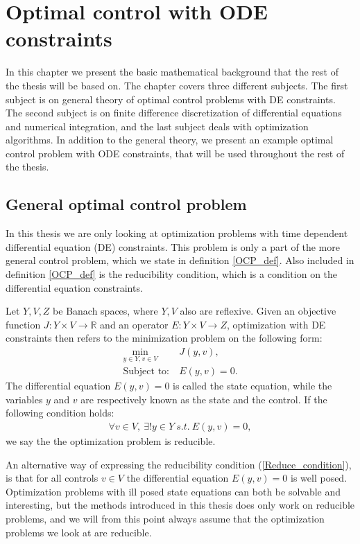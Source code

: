 \chapter{Optimal control with ODE constraints} \label{math_chap}
In this chapter we present the basic mathematical background that the rest of the thesis will be based on. The chapter covers three different subjects. The first subject is on general theory of optimal control problems with DE constraints. The second subject is on finite difference discretization of differential equations and numerical integration, and the last subject deals with optimization algorithms. In addition to the general theory, we present an example optimal control problem with ODE constraints, that will be used throughout the rest of the thesis. 
\section{General optimal control problem}
In this thesis we are only looking at optimization problems with time dependent differential equation (DE) constraints. This problem is only a part of the more general control problem, which we state in definition \ref{OCP_def}. Also included in definition \ref{OCP_def} is the reducibility condition, which is a condition on the differential equation constraints.
\begin{definition} \label{OCP_def}
Let $Y,V,Z$ be Banach spaces, where $Y,V$ also are reflexive. Given an objective function $J: Y\times V\rightarrow\mathbb{R}$ and an operator $E:Y\times V \rightarrow Z$, optimization with DE constraints then refers to the minimization problem on the following form:
\begin{align}
\underset{y\in Y,v\in V}{\text{min}} \ &J(y,v), \label{OCP_DEF_J}\\
\textrm{Subject to:} \ &E(y,v)=0. \label{OCP_DEF_E}
\end{align}
The differential equation $E(y,v)=0$ is called the state equation, while the variables $y$ and $v$ are respectively known as the state and the control. If the following condition holds:
\begin{align}
\forall v \in V, \ \exists! y \in Y \ s.t. \ E(y,v)=0, \label{Reduce_condition}
\end{align}
we say the the optimization problem is reducible.
\end{definition}
\noindent
An alternative way of expressing the reducibility condition (\ref{Reduce_condition}), is that for all controls $v\in V$ the differential equation $E(y,v)=0$ is well posed. Optimization problems with ill posed state equations can both be solvable and interesting, but the methods introduced in this thesis does only work on reducible problems, and we will from this point always assume that the optimization problems we look at are reducible. 
